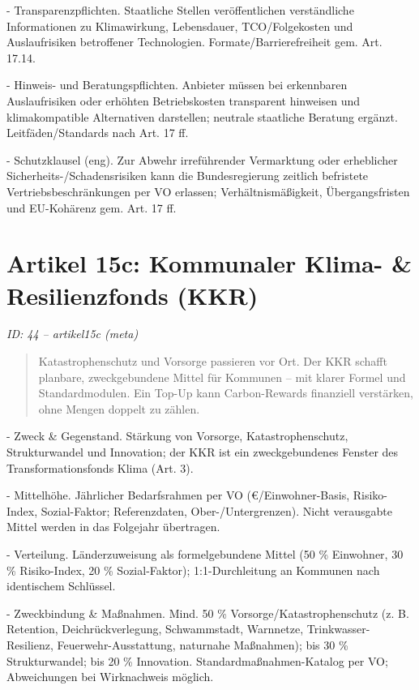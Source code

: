 \documentclass[12pt,a4paper]{scrartcl}
\begin{document}
- Transparenzpflichten. Staatliche Stellen veröffentlichen verständliche Informationen zu Klimawirkung, Lebensdauer, TCO/Folgekosten und Auslaufrisiken betroffener Technologien. Formate/Barrierefreiheit gem. Art. 17.14.

- Hinweis- und Beratungspflichten. Anbieter müssen bei erkennbaren Auslaufrisiken oder erhöhten Betriebskosten transparent hinweisen und klimakompatible Alternativen darstellen; neutrale staatliche Beratung ergänzt. Leitfäden/Standards nach Art. 17 ff.

- Schutzklausel (eng). Zur Abwehr irreführender Vermarktung oder erheblicher Sicherheits-/Schadensrisiken kann die Bundesregierung zeitlich befristete Vertriebsbeschränkungen per VO erlassen; Verhältnismäßigkeit, Übergangsfristen und EU-Kohärenz gem. Art. 17 ff.


\section[Artikel 15c: Kommunaler Klima- \& Resilienzfonds (KKR)]{Artikel 15c: Kommunaler Klima- \& Resilienzfonds (KKR)}
\noindent\textit{ID: 44 -- artikel15c (meta)}

\begin{quote}
Katastrophenschutz und Vorsorge passieren vor Ort. Der KKR schafft planbare, zweckgebundene Mittel für Kommunen -- mit klarer Formel und Standardmodulen. Ein Top-Up kann Carbon-Rewards finanziell verstärken, ohne Mengen doppelt zu zählen.
\end{quote}

- Zweck \& Gegenstand. Stärkung von Vorsorge, Katastrophenschutz, Strukturwandel und Innovation; der KKR ist ein zweckgebundenes Fenster des Transformationsfonds Klima (Art. 3).

- Mittelhöhe. Jährlicher Bedarfsrahmen per VO (€/Einwohner-Basis, Risiko-Index, Sozial-Faktor; Referenzdaten, Ober-/Untergrenzen). Nicht verausgabte Mittel werden in das Folgejahr übertragen.

- Verteilung. Länderzuweisung als formelgebundene Mittel (50 \% Einwohner, 30 \% Risiko-Index, 20 \% Sozial-Faktor); 1:1-Durchleitung an Kommunen nach identischem Schlüssel.

- Zweckbindung \& Maßnahmen. Mind. 50 \% Vorsorge/Katastrophenschutz (z. B. Retention, Deichrückverlegung, Schwammstadt, Warnnetze, Trinkwasser-Resilienz, Feuerwehr-Ausstattung, naturnahe Maßnahmen); bis 30 \% Strukturwandel; bis 20 \% Innovation. Standardmaßnahmen-Katalog per VO; Abweichungen bei Wirknachweis möglich.
\end{document}
